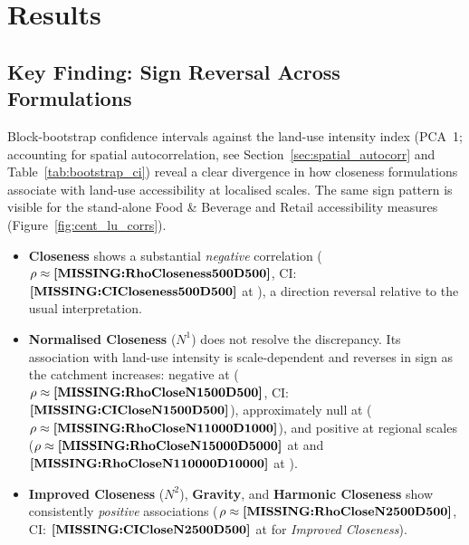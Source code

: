 \section{Results}\label{data-analysis}

\subsection{Key Finding: Sign Reversal Across Formulations}

Block-bootstrap confidence intervals against the land-use intensity index (PCA~1; accounting for spatial autocorrelation, see Section~\ref{sec:spatial_autocorr} and Table~\ref{tab:bootstrap_ci}) reveal a clear divergence in how closeness formulations associate with land-use accessibility at localised scales. The same sign pattern is visible for the stand-alone Food \& Beverage and Retail accessibility measures (Figure~\ref{fig:cent_lu_corrs}).
\begin{itemize}
  \item \textbf{Closeness} shows a substantial \emph{negative} correlation ($\rho \approx \pn{RhoCloseness500D500}$,  CI: $\pn{CICloseness500D500}$ at ), a direction reversal relative to the usual interpretation.
  \item \textbf{Normalised Closeness} ($N^1$) does not resolve the discrepancy. Its association with land-use intensity is scale-dependent and reverses in sign as the catchment increases: negative at  ($\rho \approx \pn{RhoCloseN1500D500}$,  CI: $\pn{CICloseN1500D500}$), approximately null at  ($\rho \approx \pn{RhoCloseN11000D1000}$), and positive at regional scales ($\rho \approx \pn{RhoCloseN15000D5000}$ at  and $\pn{RhoCloseN110000D10000}$ at ).
  \item \textbf{Improved Closeness} ($N^2$), \textbf{Gravity}, and \textbf{Harmonic Closeness} show consistently \emph{positive} associations ($\rho \approx \pn{RhoCloseN2500D500}$,  CI: $\pn{CICloseN2500D500}$ at  for \emph{Improved Closeness}).
\end{itemize}
